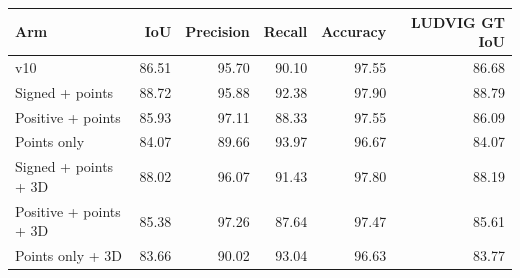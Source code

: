 \begin{tabular}{lrrrrr}
\toprule
Arm & IoU & Precision & Recall & Accuracy & LUDVIG GT IoU \\\midrule
v10 & 86.51 & 95.70 & 90.10 & 97.55 & 86.68 \\
Signed + points & 88.72 & 95.88 & 92.38 & 97.90 & 88.79 \\
Positive + points & 85.93 & 97.11 & 88.33 & 97.55 & 86.09 \\
Points only & 84.07 & 89.66 & 93.97 & 96.67 & 84.07 \\
Signed + points + 3D & 88.02 & 96.07 & 91.43 & 97.80 & 88.19 \\
Positive + points + 3D & 85.38 & 97.26 & 87.64 & 97.47 & 85.61 \\
Points only + 3D & 83.66 & 90.02 & 93.04 & 96.63 & 83.77 \\
\bottomrule
\end{tabular}
